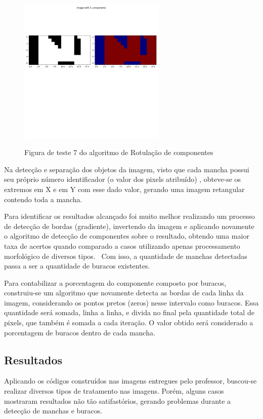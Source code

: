 \documentclass{article}
\begin{document}
\begin{figure}[!ht]
	\begin{minipage}[b]{1.0\linewidth}
		\centering
		\centerline{\includegraphics[width=7cm]{Figures/test7.png}}
		\label{fig: test7}
		\vspace{-2.0cm}
		\centerline{Figura de teste 7 do algoritmo de Rotulação de componentes}\medskip	
	\end{minipage}
\end{figure}

Na detecção e separação dos objetos da imagem, visto que cada mancha possui seu próprio número identificador (o valor dos pixels atribuído) , obteve-se os extremos em X e em Y com esse dado valor, gerando uma imagem retangular contendo toda a mancha. 


Para identificar os resultados alcançado foi muito melhor realizando um processo de detecção de bordas (gradiente), invertendo da imagem e aplicando novamente o algoritmo de detecção de componentes sobre o resultado, obtendo uma maior taxa de acertos quando comparado a casos utilizando apenas processamento morfológico de diversos tipos.  Com isso, a quantidade de manchas detectadas passa a ser a quantidade de buracos existentes. 

Para contabilizar a porcentagem do componente composto por buracos, construiu-se um algoritmo que novamente detecta as bordas de cada linha da imagem, considerando os pontos pretos (zeros) nesse intervalo como buracos. Essa quantidade será somada, linha a linha, e divida no final pela quantidade total de pixels, que também é somada a cada iteração. O valor obtido será considerado a porcentagem de buracos dentro de cada mancha.
 	
\subsection{Resultados}
Aplicando os códigos construídos nas imagens entregues pelo professor, buscou-se realizar diversos tipos de tratamento nas imagens. Porém, alguns casos mostraram resultados não tão satifastórios, gerando problemas durante a detecção de manchas e buracos.
\end{document}
